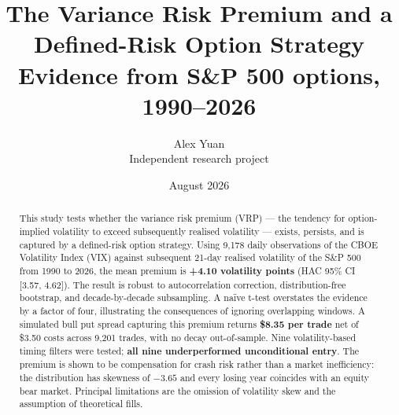 \documentclass[11pt,a4paper]{article}
\title{\textbf{The Variance Risk Premium and a Defined-Risk Option Strategy}\\[4pt]
\large Evidence from S\&P 500 options, 1990--2026}
\author{Alex Yuan\\[2pt]\small Independent research project}
\date{August 2026}
\begin{document}
\maketitle

\begin{abstract}
\noindent
This study tests whether the variance risk premium (VRP) --- the tendency for option-implied
volatility to exceed subsequently realised volatility --- exists, persists, and is captured by
a defined-risk option strategy. Using 9,178 daily observations of the CBOE Volatility Index (VIX) against
subsequent 21-day realised volatility of the S\&P 500 from 1990 to 2026, the mean premium is
\textbf{+4.10 volatility points} (HAC 95\% CI [3.57, 4.62]). The result is robust to autocorrelation
correction, distribution-free bootstrap, and decade-by-decade subsampling. A na\"ive t-test overstates
the evidence by a factor of four, illustrating the consequences of ignoring overlapping windows.
A simulated bull put spread capturing this premium returns \textbf{\$8.35 per trade} net of \$3.50
costs across 9,201 trades, with no decay out-of-sample. Nine volatility-based timing filters were
tested; \textbf{all nine underperformed unconditional entry}. The premium is shown to be compensation
for crash risk rather than a market inefficiency: the distribution has skewness of $-3.65$ and every
losing year coincides with an equity bear market. Principal limitations are the omission of volatility
skew and the assumption of theoretical fills.
\end{abstract}

\vspace{4pt}
\noindent{}
\end{document}
